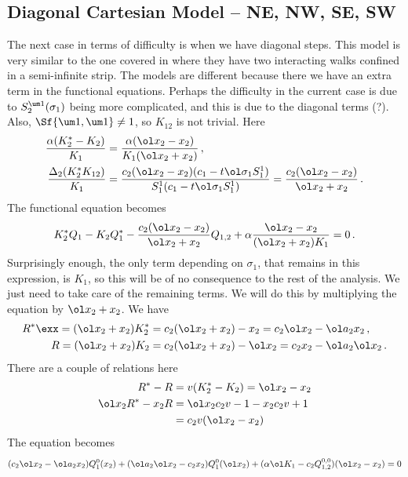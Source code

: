 \subsection{Diagonal Cartesian Model -- NE, NW, SE, SW}
The next case in terms of difficulty is when we have diagonal steps. This model is very similar to the one covered in \cite{wong2014confining} where they have two interacting walks confined in a semi-infinite strip. The models are different because there we have an extra term in the functional equations. Perhaps the difficulty in the current case is due to $S_2^{\um 1}(\sigma_1)$ being more complicated, and this is due to the diagonal terms (?). Also, $\Sf{\um 1, \um 1} \neq 1$, so $K_{12}$ is not trivial. Here
\begin{align}
	\frac{\alpha(K_2^\ast -K_2)}{K_1}  &= \frac{\alpha (\ol x_2 - x_2)}{K_1(\ol x_2+x_2)}\,,\\
	\frac{\Delta_2(K_2^\ast K_{12})}{K_1} &= \frac{c_2(\ol x_2-x_2)(c_1- t \ol \sigma_1S_1^1)}{S_1^1(c_1-t\ol \sigma_1S_1^1)} = \frac{c_2(\ol x_2-x_2)}{\ol x_2+x_2}\,.
\end{align}
The functional equation becomes
\begin{align}
   K_2^\ast Q_1 - K_2 Q_1^\ast -\frac{c_2(\ol x_2-x_2)}{\ol x_2+x_2}Q_{1,2}+\alpha\frac{\ol x_2-x_2}{(\ol x_2+x_2)K_1}= 0\,.
\end{align}
Surprisingly enough, the only term depending on $\sigma_1$, that remains in this expression, is $K_1$, so this will be of no consequence to the rest of the analysis. We just need to take care of the remaining terms. We will do this by multiplying the equation by $\ol x_2+x_2$. We have
\begin{align}
	R^\ast \exx= (\ol x_2+x_2) K_2^\ast &= c_2(\ol x_2+x_2)-x_2 = c_2\ol x_2- \ol a_2x_2\,,\\
	R = (\ol x_2+x_2) K_2 &= c_2(\ol x_2+x_2)-\ol x_2 = c_2x_2- \ol a_2\ol x_2\,.
\end{align}
There are a couple of relations here
\begin{align}
	R^\ast - R &= v(K_2^\ast-K_2) = \ol x_2-x_2\\
	\ol x_2R^\ast - x_2 R &= \ol x_2c_2v-1- x_2 c_2v+1 \\
				      & = c_2v(\ol x_2-x_2)
\end{align}
The equation becomes
\begin{align}
(c_2\ol x_2- \ol a_2x_2)Q_1^0(x_2)+ ( \ol a_2\ol x_2-c_2x_2) Q_1^0(\ol x_2)+(\alpha \ol K_1 - c_2Q_{1,2}^{0,0})(\ol x_2-x_2)= 0
\end{align}
